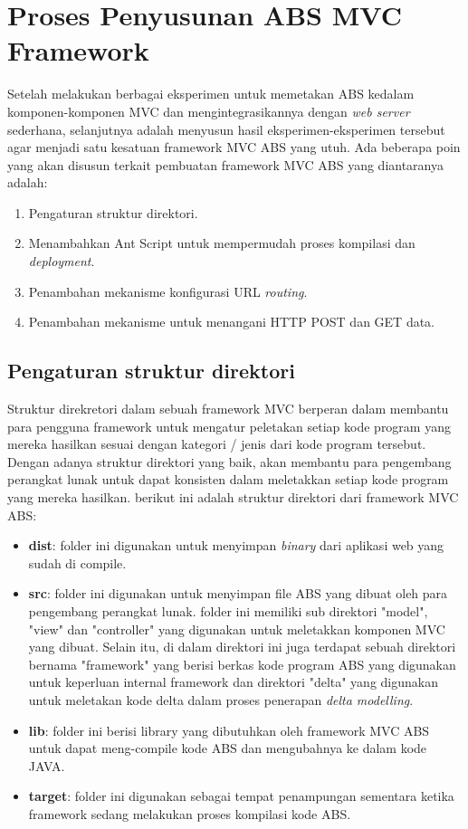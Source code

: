 \chapter{Proses Penyusunan ABS MVC Framework}

Setelah melakukan berbagai eksperimen untuk memetakan ABS kedalam komponen-komponen MVC dan mengintegrasikannya dengan \textit{web server} sederhana, selanjutnya adalah menyusun hasil eksperimen-eksperimen tersebut agar menjadi satu kesatuan framework MVC ABS yang utuh. Ada beberapa poin yang akan disusun terkait pembuatan framework MVC ABS yang diantaranya adalah:

\begin{enumerate}
    \item Pengaturan struktur direktori.
    \item Menambahkan Ant Script untuk mempermudah proses kompilasi dan \textit{deployment}.
    \item Penambahan mekanisme konfigurasi URL \textit{routing}.
    \item Penambahan mekanisme untuk menangani HTTP POST dan GET data.
\end{enumerate}

\section{Pengaturan struktur direktori}

Struktur direkretori dalam sebuah framework MVC berperan dalam membantu para pengguna framework untuk mengatur peletakan setiap kode program yang mereka hasilkan sesuai dengan kategori / jenis dari kode program tersebut. Dengan adanya struktur direktori yang baik, akan membantu para pengembang perangkat lunak untuk dapat konsisten dalam meletakkan setiap kode program yang mereka hasilkan. berikut ini adalah struktur direktori dari framework MVC ABS:

\begin{itemize}
    \item \textbf{dist}: folder ini digunakan untuk menyimpan \textit{binary} dari aplikasi web yang sudah di compile.
    \item \textbf{src}: folder ini digunakan untuk menyimpan file ABS yang dibuat oleh para pengembang perangkat lunak. folder ini memiliki sub direktori "model", "view" dan "controller" yang digunakan untuk meletakkan komponen MVC yang dibuat. Selain itu, di dalam direktori ini juga terdapat sebuah direktori bernama "framework" yang berisi berkas kode program ABS yang digunakan untuk keperluan internal framework dan direktori "delta" yang digunakan untuk meletakan kode delta dalam proses penerapan \textit{delta modelling}.
    \item \textbf{lib}: folder ini berisi library yang dibutuhkan oleh framework MVC ABS untuk dapat meng-compile kode ABS dan mengubahnya ke dalam kode JAVA.
    \item \textbf{target}: folder ini digunakan sebagai tempat penampungan sementara ketika framework sedang melakukan proses kompilasi kode ABS.
\end{itemize}

